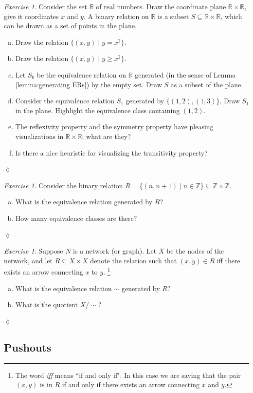 \documentclass{book}
\def\ZZ{{\mathbb Z}}
\def\RR{{\mathbb R}}
\def\ss{\subseteq}
\def\|{{\;|\;}}
\theoremstyle{remark}
\newtheorem{exc}[subsubsection]{Exercise}
\newenvironment{exercise}{\begin{exc}}{\hspace*{\fill}$\lozenge$\end{exc}}
\theoremstyle{definition}
\def\sexc{\begin{enumerate}[a.)]\setlength{\itemsep}{.1cm}\setlength{\parskip}{.1cm}\item}
\def\next{\item}
\def\endsexc{\end{enumerate}}
\begin{document}
\begin{exercise}
Consider the set $\RR$ of real numbers. Draw the coordinate plane $\RR\times\RR$, give it coordinates $x$ and $y$. A binary relation on $\RR$ is a subset $S\ss\RR\times\RR$, which can be drawn as a set of points in the plane. 
\sexc Draw the relation $\{(x,y)\|y=x^2\}$. 
\next Draw the relation $\{(x,y)\|y\geq x^2\}.$
\next Let $S_0$ be the equivalence relation on $\RR$ generated (in the sense of Lemma \ref{lemma:generating ERs}) by the empty set. Draw $S$ as a subset of the plane.
\next Consider the equivalence relation $S_1$ generated by $\{(1,2),(1,3)\}$. Draw $S_1$ in the plane. Highlight the equivalence class containing $(1,2)$.
\next The reflexivity property and the symmetry property have pleasing visualizations in $\RR\times\RR$; what are they? 
\next Is there a nice heuristic for visualizing the transitivity property?
\endsexc
\end{exercise}

\begin{exercise}
Consider the binary relation $R=\{(n,n+1)\|n\in\ZZ\}\ss\ZZ\times\ZZ$. 
\sexc What is the equivalence relation generated by $R$? 
\next How many equivalence classes are there?
\endsexc
\end{exercise}

\begin{exercise}
Suppose $N$ is a network (or graph). Let $X$ be the nodes of the network, and let $R\ss X\times X$ denote the relation such that $(x,y)\in R$ iff there exists an arrow connecting $x$ to $y$.
\footnote{The word {\em iff} means ``if and only if". In this case we are saying that the pair $(x,y)$ is in $R$ if and only if there exists an arrow connecting $x$ and $y$.}
\sexc What is the equivalence relation $\sim$ generated by $R$? 
\next What is the quotient $X/\sim$?
\endsexc
\end{exercise}


\subsection{Pushouts}\label{sec:pushouts}
\end{document}
